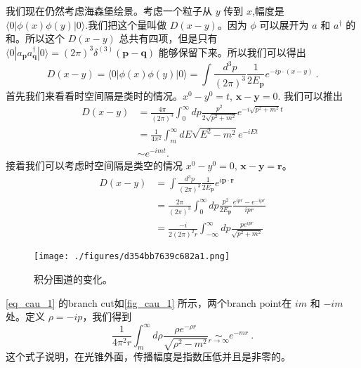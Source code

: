
我们现在仍然考虑海森堡绘景。考虑一个粒子从 $y$ 传到 $x$,幅度是 $\langle 0 |\phi(x)\phi(y)| 0 \rangle$.我们把这个量叫做 $D(x-y)$。因为 $\phi$ 可以展开为 $a$ 和 $a^\dagger$ 的和。所以这个 $D(x-y)$ 总共有四项，但是只有 $\langle 0 | a_{\mathbf p} a^\dagger_{\mathbf q} | 0 \rangle = (2\pi)^3 \delta^{(3)}(\mathbf p - \mathbf q)$ 能够保留下来。所以我们可以得出
\begin{equation}
D(x-y)=\langle 0|\phi(x) \phi(y)| 0\rangle=\int \frac{d^{3} p}{(2 \pi)^{3}} \frac{1}{2 E_{\mathbf{p}}} e^{-i p \cdot(x-y)}~.
\end{equation}
首先我们来看看时空间隔是类时的情况。$x^0 - y^0 = t$, $\mathbf x - \mathbf y = 0$. 我们可以推出
\begin{equation}
\begin{aligned}
D(x-y) &=\frac{4 \pi}{(2 \pi)^{3}} \int_{0}^{\infty} d p \frac{p^{2}}{2 \sqrt{p^{2}+m^{2}}} e^{-i \sqrt{p^{2}+m^{2}} t} \\
&=\frac{1}{4 \pi^{2}} \int_{m}^{\infty} d E \sqrt{E^{2}-m^{2}} e^{-i E t} \\
& \sim e^{-i m t} .
\end{aligned}
\end{equation}
接着我们可以考虑时空间隔是类空的情况 $x^0 - y^0 = 0$, $\mathbf x - \mathbf y = \mathbf r$。
\begin{equation}\label{eq_cau_1}
\begin{aligned}
D(x-y) &=\int \frac{d^{3} p}{(2 \pi)^{3}} \frac{1}{2 E_{\mathbf{p}}} e^{i \mathbf{p} \cdot \mathbf{r}} \\
&=\frac{2 \pi}{(2 \pi)^{3}} \int_{0}^{\infty} d p \frac{p^{2}}{2 E_{\mathbf{p}}} \frac{e^{i p r}-e^{-i p r}}{i p r} \\
&=\frac{-i}{2(2 \pi)^{2} r} \int_{-\infty}^{\infty} d p \frac{p e^{i p r}}{\sqrt{p^{2}+m^{2}}}
\end{aligned}
\end{equation}
\begin{figure}[ht]
\centering
\texttt{[image: ./figures/d354bb7639c682a1.png]}
\caption{积分围道的变化。} \label{fig_cau_1}
\end{figure}
\autoref{eq_cau_1} 的branch cut如\autoref{fig_cau_1} 所示，两个branch point在 $im$ 和 $-im$ 处。定义 $\rho = -ip$，我们得到
\begin{equation}
\frac{1}{4 \pi^{2} r} \int_{m}^{\infty} d \rho \frac{\rho e^{-\rho r}}{\sqrt{\rho^{2}-m^{2}}} \underset{r \rightarrow \infty}{\sim} e^{-m r}~.
\end{equation}
这个式子说明，在光锥外面，传播幅度是指数压低并且是非零的。

